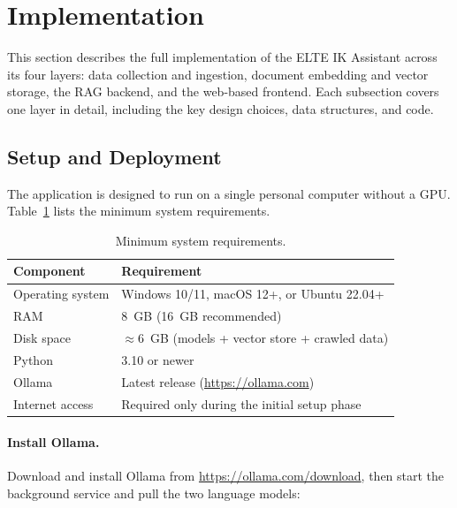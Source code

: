 \section{Implementation}
\label{sec:impl}

This section describes the full implementation of the ELTE IK Assistant across its four layers: data collection and ingestion, document embedding and vector storage, the RAG backend, and the web-based frontend. Each subsection covers one layer in detail, including the key design choices, data structures, and code.

\subsection{Setup and Deployment}
\label{subsec:impl-setup}

The application is designed to run on a single personal computer without a GPU.
Table~\ref{tab:sys-req} lists the minimum system requirements.

\begin{table}[H]
    \centering
    \begin{tabular}{ | m{} | m{} | }
        \hline
        \textbf{Component} & \textbf{Requirement} \\
        \hline \hline
        Operating system & Windows 10/11, macOS 12+, or Ubuntu 22.04+ \\
        \hline
        RAM & 8~GB (16~GB recommended) \\
        \hline
        Disk space & $\approx$6~GB (models + vector store + crawled data) \\
        \hline
        Python & 3.10 or newer \\
        \hline
        Ollama & Latest release (\url{https://ollama.com}) \\
        \hline
        Internet access & Required only during the initial setup phase \\
        \hline
    \end{tabular}
    \caption{Minimum system requirements.}
    \label{tab:sys-req}
\end{table}

\paragraph{Install Ollama.}
Download and install Ollama from \url{https://ollama.com/download}, then start the background service and pull the two language models:

